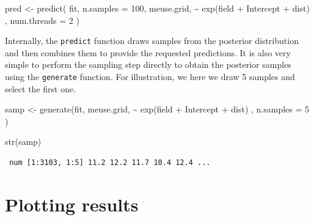 \documentclass[
  a4paper,
]{article}
\newenvironment{Shaded}{\begin{snugshade}}{\end{snugshade}}
\newcommand{\AttributeTok}[1]{\textcolor[rgb]{0.40,0.45,0.13}{#1}}
\newcommand{\DecValTok}[1]{\textcolor[rgb]{0.68,0.00,0.00}{#1}}
\newcommand{\FunctionTok}[1]{\textcolor[rgb]{0.28,0.35,0.67}{#1}}
\newcommand{\NormalTok}[1]{\textcolor[rgb]{0.00,0.23,0.31}{#1}}
\newcommand{\OtherTok}[1]{\textcolor[rgb]{0.00,0.23,0.31}{#1}}
\newcommand{\SpecialCharTok}[1]{\textcolor[rgb]{0.37,0.37,0.37}{#1}}
\begin{document}
\begin{Shaded}
\begin{Highlighting}[]
\NormalTok{pred }\OtherTok{\textless{}{-}} \FunctionTok{predict}\NormalTok{(}
\NormalTok{  fit,}
  \AttributeTok{n.samples =} \DecValTok{100}\NormalTok{,}
\NormalTok{  meuse.grid,}
  \SpecialCharTok{\textasciitilde{}} \FunctionTok{exp}\NormalTok{(field }\SpecialCharTok{+}\NormalTok{ Intercept }\SpecialCharTok{+}\NormalTok{ dist) ,}
  \AttributeTok{num.threads =} \DecValTok{2}
\NormalTok{)}
\end{Highlighting}
\end{Shaded}

Internally, the \texttt{predict} function draws samples from the
posterior distribution and then combines them to provide the requested
predictions. It is also very simple to perform the sampling step
directly to obtain the posterior samples using the \texttt{generate}
function. For illustration, we here we draw 5 samples and select the
first one.

\begin{Shaded}
\begin{Highlighting}[]
\NormalTok{samp }\OtherTok{\textless{}{-}} \FunctionTok{generate}\NormalTok{(fit, }
\NormalTok{                 meuse.grid,}
                 \SpecialCharTok{\textasciitilde{}} \FunctionTok{exp}\NormalTok{(field }\SpecialCharTok{+}\NormalTok{ Intercept }\SpecialCharTok{+}\NormalTok{ dist) ,}
                 \AttributeTok{n.samples =} \DecValTok{5}
\NormalTok{)}

\FunctionTok{str}\NormalTok{(samp)}
\end{Highlighting}
\end{Shaded}

\begin{verbatim}
 num [1:3103, 1:5] 11.2 12.2 11.7 10.4 12.4 ...
\end{verbatim}

\begin{Shaded}
\end{Shaded}

\hypertarget{plotting-results}{%
\section{Plotting results}\label{plotting-results}}
\end{document}
